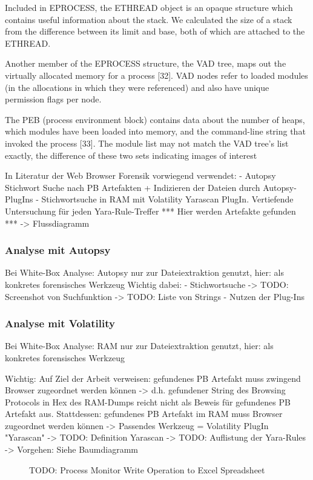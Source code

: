 	Included in EPROCESS, the ETHREAD object is an opaque structure which contains useful information about the stack. We calculated the size of a stack from the difference between its limit and base, both of which are attached to the ETHREAD.
	
	Another member of the EPROCESS structure, the VAD tree, maps out the virtually allocated memory for a process [32]. VAD nodes refer to loaded modules (in the allocations in which they were referenced) and also have unique permission flags per node.
	
	The PEB (process environment block) contains data about the number of heaps, which modules have been loaded into memory, and the command-line string that invoked the process [33]. The module list may not match the VAD tree’s list
	exactly, the difference of these two sets indicating images of interest


In Literatur der Web Browser Forensik vorwiegend verwendet: 
- Autopsy Stichwort Suche nach PB Artefakten + Indizieren der Dateien durch Autopsy-PlugIns
- Stichwortsuche in RAM mit Volatility Yarascan PlugIn. Vertiefende Untersuchung für jeden Yara-Rule-Treffer *** Hier werden Artefakte gefunden *** -> Flussdiagramm

\subsubsection*{Analyse mit Autopsy}
Bei White-Box Analyse: Autopsy nur zur Dateiextraktion genutzt, hier: als konkretes forensisches Werkzeug
Wichtig dabei:
- Stichwortsuche 
	-> TODO: Screenshot von Suchfunktion
	-> TODO: Liste von Strings
- Nutzen der Plug-Ins

\subsubsection*{Analyse mit Volatility}
Bei White-Box Analyse: RAM nur zur Dateiextraktion genutzt, hier: als konkretes forensisches Werkzeug

Wichtig: Auf Ziel der Arbeit verweisen: gefundenes PB Artefakt muss zwingend Browser zugeordnet werden können -> d.h. gefundener String des Browsing Protocols in Hex des RAM-Dumps reicht nicht als Beweis für gefundenes PB Artefakt aus.
Stattdessen: gefundenes PB Artefakt im RAM muss Browser zugeordnet werden können -> Passendes Werkzeug = Volatility PlugIn "Yarascan" 
-> TODO: Definition Yarascan
-> TODO: Auflistung der Yara-Rules
-> Vorgehen: Siehe Baumdiagramm
\begin{figure}[h!]
	\centering
	\small
	\centerline{\resizebox{\linewidth}{!}{}}
	\caption{TODO: Process Monitor Write Operation to Excel Spreadsheet}
	\label{fig:jes}
\end{figure}





